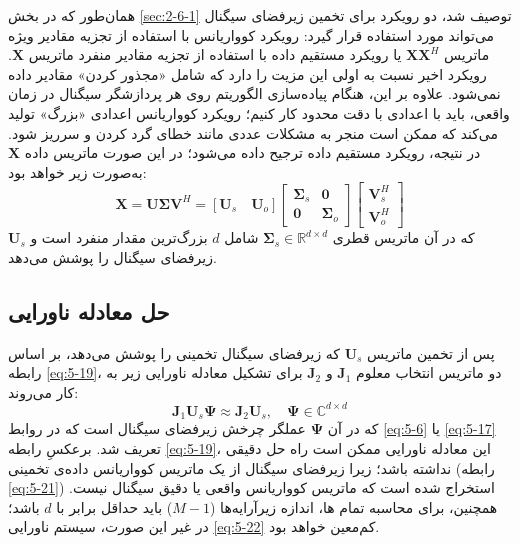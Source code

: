 همان‌طور که در بخش \ref{sec:2-6-1} توصیف شد، دو رویکرد برای تخمین زیرفضای سیگنال می‌تواند مورد استفاده قرار گیرد: رویکرد کوواریانس با استفاده از تجزیه مقادیر ویژه ماتریس $\bm{XX}^H$ یا رویکرد مستقیم داده با استفاده از تجزیه مقادیر منفرد ماتریس $\bm{X}$. رویکرد اخیر نسبت به اولی این مزیت را دارد که شامل «مجذور کردن» مقادیر داده نمی‌شود. علاوه بر این، هنگام پیاده‌سازی الگوریتم روی هر پردازشگر سیگنال در زمان واقعی، باید با اعدادی با دقت محدود کار کنیم؛ رویکرد کوواریانس اعدادی «بزرگ» تولید می‌کند که ممکن است منجر به مشکلات عددی مانند خطای گرد کردن و سرریز شود. در نتیجه، رویکرد مستقیم داده ترجیح داده می‌شود؛ در این صورت  ماتریس داده $\bm{X}$ به‌صورت زیر خواهد بود:
\begin{equation}
	\bm{X} = \bm{U}\bm{\Sigma}\bm{V}^H = [\bm{U}_s \quad \bm{U}_o] 
	\begin{bmatrix} 
		\bm{\Sigma}_s & \bm{0} \\
		\bm{0} & \bm{\Sigma}_o
	\end{bmatrix} 
	\begin{bmatrix} 
		\bm{V}_s^H \\ 
		\bm{V}_o^H 
	\end{bmatrix}
	\label{eq:5-21}
\end{equation}
که در آن ماتریس قطری $\bm{\Sigma}_s \in \mathbb{R}^{d \times d}$ شامل $d$ بزرگ‌ترین مقدار منفرد است و $\bm{U}_s$ زیرفضای سیگنال را پوشش می‌دهد.

\subsection{حل معادله ناورایی}
\label{subsec:5-3-2}
پس از تخمین ماتریس $\bm{U}_s$ که زیرفضای سیگنال تخمینی را پوشش می‌دهد، بر اساس رابطه \eqref{eq:5-19}، دو ماتریس انتخاب معلوم $\bm{J}_1$ و $\bm{J}_2$ برای تشکیل معادله ناورایی زیر به کار می‌روند:
\begin{equation}
	\bm{J}_1 \bm{U}_s \bm{\Psi} \approx \bm{J}_2 \bm{U}_s, \quad \bm{\Psi} \in \mathbb{C}^{d \times d}
	\label{eq:5-22}
\end{equation}
که در آن $\bm{\Psi}$ عملگر چرخش زیرفضای سیگنال است که در روابط \eqref{eq:5-6} یا \eqref{eq:5-17} تعریف شد. برعکسِ رابطه \eqref{eq:5-19}، این معادله ناورایی ممکن است راه حل دقیقی نداشته باشد؛ زیرا زیرفضای سیگنال از یک ماتریس کوواریانس داده‌ی تخمینی (رابطه \ref{eq:5-21}) استخراج شده است که ماتریس کوواریانس واقعی یا دقیق سیگنال نیست. همچنین، برای محاسبه تمام ها، اندازه زیرآرایه‌ها ($M-1$) باید حداقل برابر با $d$ باشد؛ در غیر این صورت، سیستم ناورایی \eqref{eq:5-22} کم‌معین خواهد بود.

